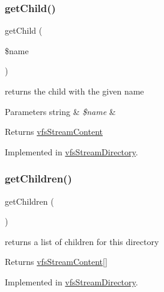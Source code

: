 \subsubsection{\texorpdfstring{get\+Child()}{getChild()}}
{\footnotesize\ttfamily get\+Child (\begin{DoxyParamCaption}\item[{}]{\$name }\end{DoxyParamCaption})}

returns the child with the given name


\begin{DoxyParams}[1]{Parameters}
string & {\em \$name} & \\
\hline
\end{DoxyParams}
\begin{DoxyReturn}{Returns}
\mbox{\hyperlink{interfaceorg_1_1bovigo_1_1vfs_1_1vfs_stream_content}{vfs\+Stream\+Content}} 
\end{DoxyReturn}


Implemented in \mbox{\hyperlink{classorg_1_1bovigo_1_1vfs_1_1vfs_stream_directory_a1cfdba129d25b04b73af8290f58ba7c1}{vfs\+Stream\+Directory}}.

\mbox{\label{interfaceorg_1_1bovigo_1_1vfs_1_1vfs_stream_container_a8650a4f6150ed357d88fa043f1685ac5}} 
\subsubsection{\texorpdfstring{get\+Children()}{getChildren()}}
{\footnotesize\ttfamily get\+Children (\begin{DoxyParamCaption}{ }\end{DoxyParamCaption})}

returns a list of children for this directory

\begin{DoxyReturn}{Returns}
\mbox{\hyperlink{interfaceorg_1_1bovigo_1_1vfs_1_1vfs_stream_content}{vfs\+Stream\+Content}}\mbox{[}\mbox{]} 
\end{DoxyReturn}


Implemented in \mbox{\hyperlink{classorg_1_1bovigo_1_1vfs_1_1vfs_stream_directory_a8650a4f6150ed357d88fa043f1685ac5}{vfs\+Stream\+Directory}}.

